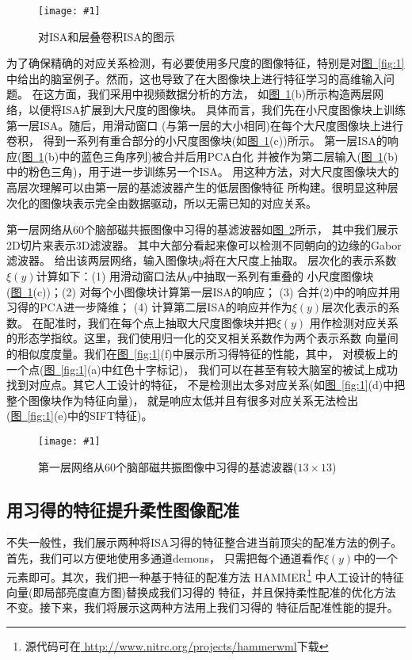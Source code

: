 \documentclass[a4paper]{article}
\newcommand{\addplot}[1]{\centering
	\texttt{[image: \#1]}}
\numberwithin{equation}{section}
\newcommand{\figref}[1]{\hyperref[fig:#1]{\figurename~\ref*{fig:#1}}}
\renewcommand{\figurename}{图}
\begin{document}
\begin{figure}
    \addplot{res/fig2.png}
    \caption{对ISA和层叠卷积ISA的图示}
    \label{fig:2}
\end{figure}

为了确保精确的对应关系检测，有必要使用多尺度的图像特征，特别是对\figref{1}
中给出的脑室例子。然而，这也导致了在大图像块上进行特征学习的高维输入问题。
在这方面，我们采用\cite{le2011learning}中视频数据分析的方法，
如\figref{2}(b)所示构造两层网络，以便将ISA扩展到大尺度的图像块。
具体而言，我们先在小尺度图像块上训练第一层ISA。随后，用滑动窗口
(与第一层的大小相同)在每个大尺度图像块上进行卷积，
得到一系列有重合部分的小尺度图像块(如\figref{2}(c))所示。
第一层ISA的响应(\figref{2}(b)中的蓝色三角序列)被合并后用PCA白化
并被作为第二层输入(\figref{2}(b)中的粉色三角)，用于进一步训练另一个ISA。
用这种方法，对大尺度图像块大的高层次理解可以由第一层的基滤波器产生的低层图像特征
所构建。很明显这种层次化的图像块表示完全由数据驱动，所以无需已知的对应关系。

第一层网络从60个脑部磁共振图像中习得的基滤波器如\figref{3}所示，
其中我们展示2D切片来表示3D滤波器。
其中大部分看起来像可以检测不同朝向的边缘的Gabor滤波器。
给出该两层网络，输入图像块$y$将在大尺度上抽取。
层次化的表示系数$\xi(y)$计算如下：(1) 用滑动窗口法从$y$中抽取一系列有重叠的
小尺度图像块(\figref{2}(c))；(2) 对每个小图像块计算第一层ISA的响应；
(3) 合并(2)中的响应并用习得的PCA进一步降维；
(4) 计算第二层ISA的响应并作为$\xi(y)$层次化表示的系数。
在配准时，我们在每个点上抽取大尺度图像块并把$\xi(y)$
用作检测对应关系的形态学指纹。这里，我们使用归一化的交叉相关系数作为两个表示系数
向量间的相似度度量。我们在\figref{1}(f)中展示所习得特征的性能，其中，
对模板上的一个点(\figref{1}(a)中红色十字标记)，
我们可以在甚至有较大脑室的被试上成功找到对应点。其它人工设计的特征，
不是检测出太多对应关系(如\figref{1}(d)中把整个图像块作为特征向量)，
就是响应太低并且有很多对应关系无法检出(\figref{1}(e)中的SIFT特征)。


\begin{figure}
    \addplot{res/fig3.png}
    \caption{第一层网络从60个脑部磁共振图像中习得的基滤波器($13\times 13$)}
    \label{fig:3}
\end{figure}



\subsection{用习得的特征提升柔性图像配准}
不失一般性，我们展示两种将ISA习得的特征整合进当前顶尖的配准方法的例子。
首先，我们可以方便地使用多通道demons\cite{peyrat2008registration}，
只需把每个通道看作$\xi(y)$中的一个元素即可。其次，我们把一种基于特征的配准方法
HAMMER\cite{shen2007image}\footnote{源代码可在\url{
http://www.nitrc.org/projects/hammerwml}下载}
中人工设计的特征向量(即局部亮度直方图)替换成我们习得的
特征，并且保持柔性配准的优化方法不变。接下来，我们将展示这两种方法用上我们习得的
特征后配准性能的提升。
\end{document}
